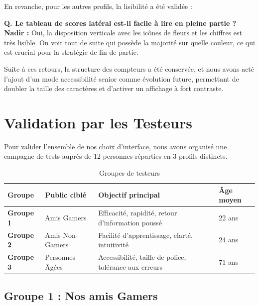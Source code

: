 \documentclass[11pt,a4paper]{article}
\begin{document}
En revanche, pour les autres profils, la lisibilité a été validée :

\begin{tcolorbox}[gamerbox, title={Nadir -- 22 ans, joueur de jeux de cartes en ligne}]
    \textbf{Q. Le tableau de scores latéral est-il facile à lire en pleine partie ?}\\
    \textbf{Nadir :} Oui, la disposition verticale avec les icônes de fleurs et les chiffres est très lisible. On voit tout de suite qui possède la majorité sur quelle couleur, ce qui est crucial pour la stratégie de fin de partie.
\end{tcolorbox}

Suite à ces retours, la structure des compteurs a été conservée, et nous avons acté l'ajout d'un mode accessibilité senior comme évolution future, permettant de doubler la taille des caractères et d'activer un affichage à fort contraste.

\newpage

\section{Validation par les Testeurs}

Pour valider l'ensemble de nos choix d'interface, nous avons organisé une campagne de tests auprès de 12 personnes réparties en 3 profils distincts.

\begin{table}[ht]
    \centering
    \caption{Groupes de testeurs}
    \vspace{0.2cm}
    \begin{tabular}{llp{7.5cm}l}
        \toprule
        \textbf{Groupe} & \textbf{Public ciblé} & \textbf{Objectif principal} & \textbf{Âge moyen} \\
        \midrule
        \textbf{Groupe 1} & Amis Gamers & Efficacité, rapidité, retour d'information poussé & 22 ans \\
        \textbf{Groupe 2} & Amis Non-Gamers & Facilité d'apprentissage, clarté, intuitivité & 24 ans \\
        \textbf{Groupe 3} & Personnes Âgées & Accessibilité, taille de police, tolérance aux erreurs & 71 ans \\
        \bottomrule
    \end{tabular}
    \label{tab:groupes}
\end{table}

\subsection{Groupe 1 : Nos amis Gamers}
\end{document}
